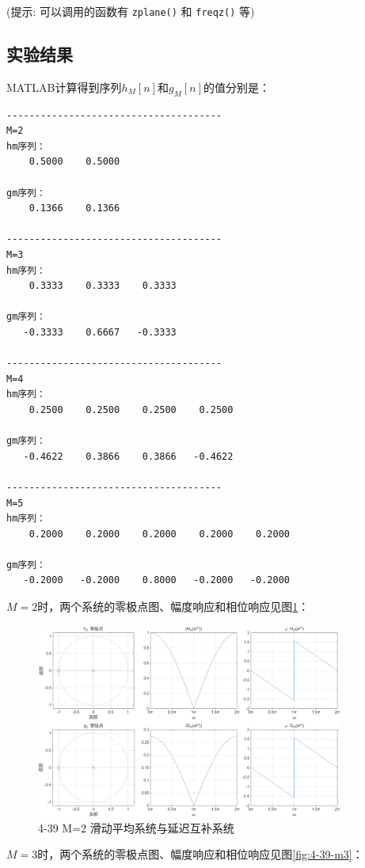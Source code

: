 \documentclass[UTF8,12pt,a4paper]{ctexart}
\begin{document}
(提示: 可以调用的函数有 \texttt{zplane()} 和 \texttt{freqz()} 等)

\subsection{实验结果}

MATLAB计算得到序列$h_{M}[n]$和$g_{M}[n]$的值分别是：

\begin{verbatim}
--------------------------------------
M=2
hm序列：
    0.5000    0.5000

gm序列：
    0.1366    0.1366

--------------------------------------
M=3
hm序列：
    0.3333    0.3333    0.3333

gm序列：
   -0.3333    0.6667   -0.3333

--------------------------------------
M=4
hm序列：
    0.2500    0.2500    0.2500    0.2500

gm序列：
   -0.4622    0.3866    0.3866   -0.4622

--------------------------------------
M=5
hm序列：
    0.2000    0.2000    0.2000    0.2000    0.2000

gm序列：
   -0.2000   -0.2000    0.8000   -0.2000   -0.2000
\end{verbatim}

$M=2$时，两个系统的零极点图、幅度响应和相位响应见图\ref{fig:4-39-m2}：

\begin{figure}[htbp]
    \centering
    \includegraphics[width=0.9\textwidth]{4-39_M=2.png}
    \caption{4-39 M=2 滑动平均系统与延迟互补系统}
    \label{fig:4-39-m2}
\end{figure}

$M=3$时，两个系统的零极点图、幅度响应和相位响应见图\ref{fig:4-39-m3}：
\end{document}
